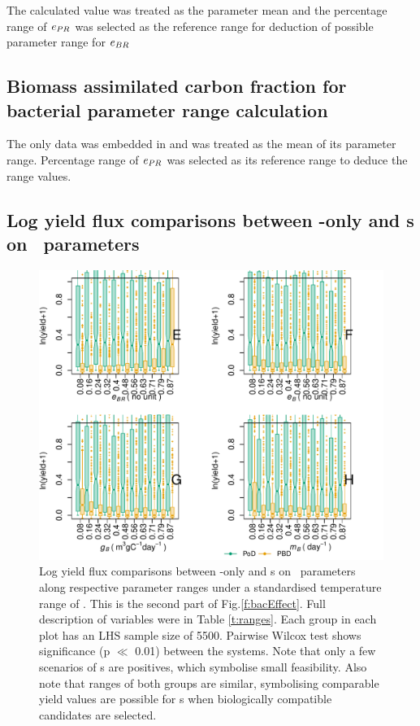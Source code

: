 \documentclass[../thesis.tex]{subfiles} %
\begin{document}
The calculated value was treated as the parameter mean and the percentage range of $e_{PR}$ was selected as the reference range for deduction of possible parameter range for $e_{BR}$

\subsection{Biomass assimilated carbon fraction for bacterial parameter range calculation}
The only data was embedded in \autocite{cochran1988estimation} and was treated as the mean of its parameter range.  Percentage range of $e_{PR}$ was selected as its reference range to deduce the range values.

\subsection{Log yield flux comparisons between \phy-only and \pbs s on \bac\ parameters}
\begin{figure}[H]
    \centering
    \includegraphics[width=\linewidth]{result/bacEff2.pdf}
    \caption[Log yield flux comparisons between \phy-only and \pbs s on \bac\ parameters]{Log yield flux comparisons between \phy-only and \pbs s on \bac\ parameters along respective parameter ranges under a standardised temperature range of \temp.  This is the second part of Fig.\ref{f:bacEffect}.  Full description of variables were in Table \ref{t:ranges}.  Each group in each plot has an LHS sample size of 5500.  Pairwise Wilcox test shows significance (p $\ll$ 0.01) between the systems.  Note that only a few scenarios of \pbs s are positives, which symbolise small feasibility.  Also note that ranges of both groups are similar, symbolising comparable yield values are possible for \pbs s when biologically compatible candidates are selected.}
    \label{f:bacEffect2}
\end{figure}
\end{document}

